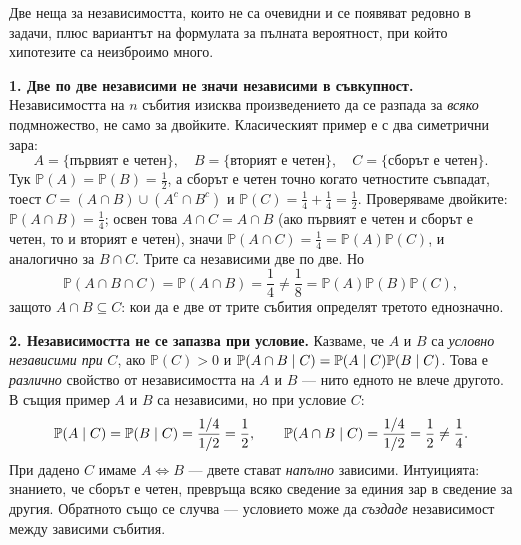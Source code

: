 \begin{supp}
Две неща\label{supp:cond-indep} за независимостта, които не са очевидни и се появяват редовно в
задачи, плюс вариантът на формулата за пълната вероятност, при който хипотезите са неизброимо
много.

\textbf{1. Две по две независими не значи независими в съвкупност.} Независимостта на
$n$ събития изисква произведението да се разпада за \emph{всяко} подмножество, не само за
двойките. Класическият пример е с два симетрични зара:
\[
A = \{\text{първият е четен}\}, \quad
B = \{\text{вторият е четен}\}, \quad
C = \{\text{сборът е четен}\} .
\]
Тук $\mathbb{P}(A) = \mathbb{P}(B) = \frac12$, а сборът е четен точно когато четностите съвпадат,
тоест $C = (A \cap B) \cup (A^c \cap B^c)$ и $\mathbb{P}(C) = \frac14 + \frac14 = \frac12$.
Проверяваме двойките: $\mathbb{P}(A \cap B) = \frac14$; освен това $A \cap C = A \cap B$ (ако
първият е четен и сборът е четен, то и вторият е четен), значи
$\mathbb{P}(A \cap C) = \frac14 = \mathbb{P}(A)\mathbb{P}(C)$, и аналогично за $B \cap C$. Трите са
независими две по две. Но
\[
\mathbb{P}(A \cap B \cap C) = \mathbb{P}(A \cap B) = \frac14 \ne \frac18 = \mathbb{P}(A)\mathbb{P}(B)\mathbb{P}(C),
\]
защото $A \cap B \subseteq C$: кои да е две от трите събития определят третото еднозначно.

\textbf{2. Независимостта не се запазва при условие.} Казваме, че $A$ и $B$ са \emph{условно
независими при} $C$, ако $\mathbb{P}(C)>0$ и
$\mathbb{P}(A \cap B \mid C) = \mathbb{P}(A \mid C)\mathbb{P}(B \mid C)$.
Това е \emph{различно} свойство от независимостта на $A$ и $B$ — нито едното не влече другото.
В същия пример $A$ и $B$ са независими, но при условие $C$:
\[
\mathbb{P}(A \mid C) = \mathbb{P}(B \mid C) = \frac{1/4}{1/2} = \frac12,
\qquad
\mathbb{P}(A \cap B \mid C) = \frac{1/4}{1/2} = \frac12 \ne \frac14 .
\]
При дадено $C$ имаме $A \iff B$ — двете стават \emph{напълно} зависими. Интуицията: знанието,
че сборът е четен, превръща всяко сведение за единия зар в сведение за другия. Обратното също
се случва — условието може да \emph{създаде} независимост между зависими събития.


\end{supp}

